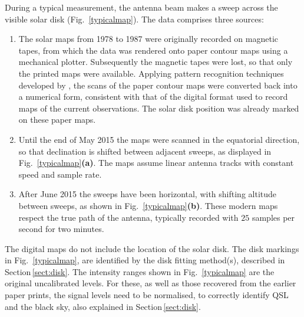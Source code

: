 \documentclass{aa}
\begin{document}
  During a typical measurement, the antenna beam makes a sweep across the
  visible solar disk (Fig.~\ref{typicalmap}).
  The data comprises three sources:
  \begin{enumerate}[A]
    \item
    The solar maps from 1978 to 1987 were originally recorded on magnetic
    tapes, from which the data was rendered onto paper contour maps using a
    mechanical plotter.
    Subsequently the magnetic tapes were lost, so that only the printed maps
    were available. 
    Applying pattern recognition techniques developed by
    \cite{masterthesis}, the scans of the paper contour maps were converted
    back into a numerical form, consistent with that of 
    the digital format used to record maps of the current observations.
    The solar disk position was already marked on these paper maps.
    \item
    Until the end of May 2015 the maps were scanned in the equatorial direction,
    so that declination is shifted between adjacent sweeps, as displayed in
    Fig.~\ref{typicalmap}{\bf(a)}.
    The maps assume linear antenna tracks with constant speed and sample rate.
    \item
    After June 2015 the sweeps have been horizontal, with shifting altitude
    between sweeps, as shown in Fig.~\ref{typicalmap}{\bf(b)}.
    These modern maps respect the true path of the antenna, typically recorded
    with $25$ samples per second for two minutes.
  \end{enumerate}

  The digital maps do not include the location of the solar disk.
  The disk markings in Fig.~\ref{typicalmap}, are identified by the 
  disk fitting method(s), described in Section\,\ref{sect:disk}.
  The intensity ranges shown in Fig.~\ref{typicalmap} are the original
  uncalibrated levels.
  For these, as well as those recovered from the earlier paper prints, the 
  signal levels need to be normalised, to correctly identify QSL and the
  black sky, also explained in Section\,\ref{sect:disk}.
\end{document}
